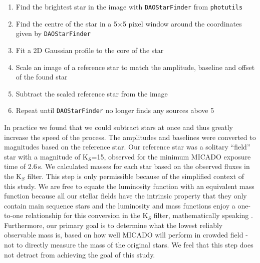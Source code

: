 \begin{enumerate}
    \item Find the brightest star in the image with \verb+DAOStarFinder+ from \verb+photutils+ \citep{photutils}
    \item Find the centre of the star in a 5$\times$5 pixel window around the coordinates given by \verb+DAOStarFinder+
    \item Fit a 2D Gaussian profile to the core of the star
    \item Scale an image of a reference star to match the amplitude, baseline and offset of the found star
    \item Subtract the scaled reference star from the image
    \item Repeat until \verb+DAOStarFinder+ no longer finds any sources above 5\,\sig
\end{enumerate}

In practice we found that we could subtract  stars at once and thus
greatly increase the speed of the process. The amplitudes and baselines were
converted to magnitudes based on the reference star. Our reference star was a
solitary ``field'' star with a magnitude of K$_S$=15, observed for the
minimum {MICADO} exposure time of 2.6\,s. We calculated masses for each star
based on the observed fluxes in the K$_S$ filter. This step is only
permissible  because of the simplified context of this study. We are free to
equate the luminosity function with an equivalent mass function because all
our  stellar fields have the intrinsic property that they only contain main
sequence stars and the luminosity and mass functions enjoy a one-to-one
relationship for this conversion in the K$_S$ filter, mathematically speaking
.  Furthermore, our primary goal is to determine what the lowest reliably
observable mass is, based on how well MICADO will perform in crowded field -
not to directly measure the mass of the original stars. We feel that this
step  does not detract from achieving the goal of this study.


